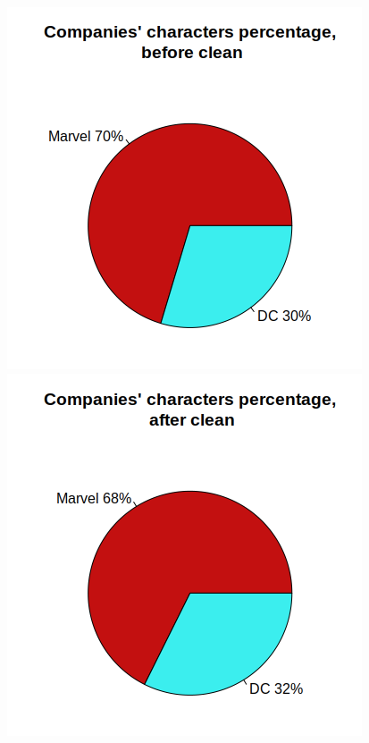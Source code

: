 \begin{figure}[!htb]
    \centering
    \begin{minipage}{.5\textwidth}
        \centering
        \includegraphics[width=.8\linewidth]{img/pie_bf_company.png}
    \end{minipage}%
    \begin{minipage}{0.5\textwidth}
        \centering
        \includegraphics[width=0.8\linewidth]{img/pie_after_comp.png}
    \end{minipage}
\end{figure}

